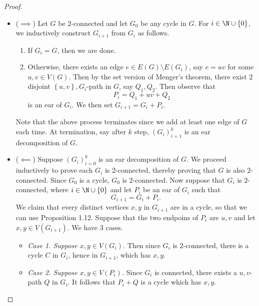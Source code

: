 \documentclass[co342]{subfiles}
\begin{document}
    \begin{proof}
        \begin{itemize}
            \item ($\implies$) Let $G$ be $2$-connected and let $G_0$ be any cycle in $G$. For $i\in\N\cup\left\lbrace 0 \right\rbrace$, we inductively construct $G_{i+1}$ from $G_i$ as follows.
                \begin{enumerate}
                    \item If $G_i=G$, then we are done.
                    \item Otherwise, there exists an edge $e\in E\left( G \right)\setminus E\left( G_i \right)$, say $e=uv$ for some $u,v\in V\left( G \right)$. Then by the set version of Menger's theorem, there exist $2$ disjoint $\left\lbrace u,v \right\rbrace,G_i$-path in $G$, say $Q_1,Q_2$. Then observe that
                        \begin{equation*}
                            P_i = Q_1+uv+Q_2
                        \end{equation*}
                        is an ear of $G_i$. We then set $G_{i+1}=G_i+P_i$.
                \end{enumerate}
                Note that the above process terminates since we add at least one edge of $G$ each time. At termination, say after $k$ step, $\left( G_{i} \right)^{k}_{i=1}$ is an ear decomposition of $G$.
            \item ($\impliedby$) Suppose $\left( G_{i} \right)^{k}_{i=0}$ is an ear decomposition of $G$. We proceed inductively to prove each $G_i$ is $2$-connected, thereby proving that $G$ is also $2$-connected. Since $G_0$ is a cycle, $G_0$ is $2$-connected. Now suppose that $G_i$ is $2$-connected, where $i\in\N\cup\left\lbrace 0 \right\rbrace$ and let $P_i$ be an ear of $G_i$ such that
                \begin{equation*}
                    G_{i+1} = G_i+P_i.
                \end{equation*}
                We claim that every distinct vertices $x,y$ in $G_{i+1}$ are in a cycle, so that we can use Proposition 1.12. Suppose that the two endpoins of $P_i$ are $u,v$ and let $x,y\in V\left( G_{i+1} \right)$. We have $3$ cases.
                \begin{itemize}
                    \item \textit{Case 1. Suppose $x,y\in V\left( G_i \right)$.} Then since $G_i$ is $2$-connected, there is a cycle $C$ in $G_i$, hence in $G_{i+1}$, which has $x,y$.
                    \item \textit{Case 2. Suppose $x,y\in V\left( P_i \right)$.} Since $G_i$ is connected, there exists a $u,v$-path $Q$ in $G_i$. It follows that $P_i+Q$ is a cycle which has $x,y$.

\end{itemize}
\end{itemize}
\end{proof}
\end{document}
